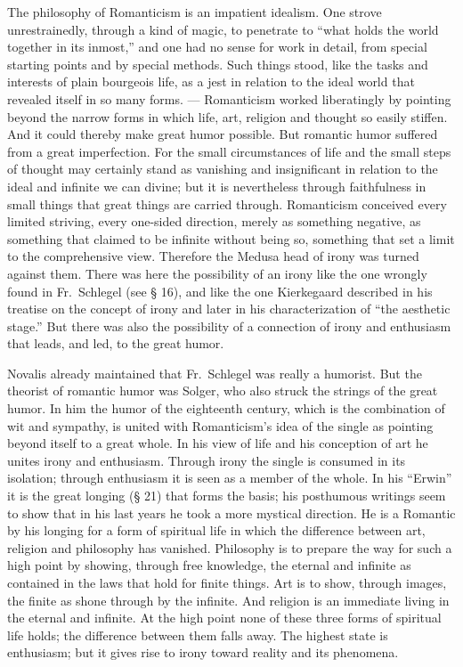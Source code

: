 \documentclass[12pt]{book}
\newcommand{\opage}[1]{\marginnote{\footnotesize\textit{[#1]}}}
\begin{document}
The philosophy of Romanticism is an impatient idealism. One strove unrestrainedly, through a kind
of magic, to penetrate to ``what holds the world together in its inmost,'' and one had no sense
for work in detail, from special starting points and by special methods. Such things stood, like
the tasks and interests of plain bourgeois life, as a jest in relation to the ideal world that
revealed itself in so many forms. --- Romanticism worked liberatingly by pointing beyond the
narrow forms in which life, art, religion and thought so easily stiffen. And it could thereby make
great humor possible. But romantic humor suffered from a great imperfection. For the small
circumstances of life and the small steps of thought may certainly stand as \opage{163}vanishing
and insignificant in relation to the ideal and infinite we can divine; but it is nevertheless
through faithfulness in small things that great things are carried through. Romanticism conceived
every limited striving, every one-sided direction, merely as something negative, as something that
claimed to be infinite without being so, something that set a limit to the comprehensive view.
Therefore the Medusa head of irony was turned against them. There was here the possibility of an
irony like the one wrongly found in Fr.~Schlegel (see § 16), and like the one Kierkegaard
described in his treatise on the concept of irony and later in his characterization of ``the
aesthetic stage.'' But there was also the possibility of a connection of irony and enthusiasm that
leads, and led, to the great humor.

Novalis already maintained that Fr.~Schlegel was really a humorist. But the theorist of romantic
humor was Solger, who also struck the strings of the great humor. In him the humor of the
eighteenth century, which is the combination of wit and sympathy, is united with Romanticism's idea
of the single as pointing beyond itself to a great whole. In his view of life and his conception
of art he unites irony and enthusiasm. Through irony the single is consumed in its isolation;
through enthusiasm it is seen as a member of the whole. In his ``Erwin'' it is the great longing
(§ 21) that forms the basis; his posthumous writings seem to show that in his last years he took a
more mystical direction. He is a Romantic by his longing for a form of spiritual life in which the
difference between art, religion and philosophy has vanished. Philosophy is to prepare the way for
such a high point by showing, through free knowledge, the eternal and infinite as contained in the
laws that hold for finite things. Art is to show, through images, the finite as shone through by
the infinite. And religion is an immediate living in the eternal and infinite. At the high point
none of these three forms of spiritual life holds; the difference between them falls away. The
highest state is enthusiasm; but it gives rise to irony toward reality and its phenomena.
\end{document}

